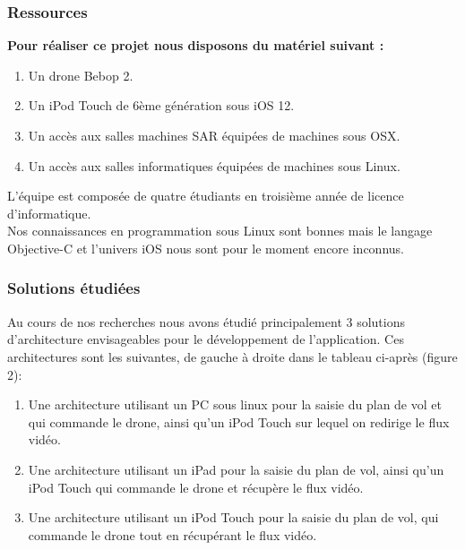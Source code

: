 \documentclass{article}
\begin{document}
	

	
\subsubsection{Ressources}

	    \textbf{Pour réaliser ce projet nous disposons du matériel suivant :}

		\begin{enumerate}
        \item Un drone Bebop 2.
        \item Un iPod Touch de 6ème génération sous iOS 12.
        \item Un accès aux salles machines SAR équipées de machines sous OSX.
        \item Un accès aux salles informatiques équipées de machines sous Linux.
        \end{enumerate}
        

	L'équipe est composée de quatre étudiants en troisième année de licence d'informatique.\\
        Nos connaissances en programmation sous Linux sont bonnes mais le langage Objective-C et l'univers iOS nous sont pour le moment encore inconnus.

\subsubsection{Solutions étudiées}
	Au cours de nos recherches nous avons étudié principalement 3 solutions d'architecture envisageables pour le développement de l'application. Ces architectures sont les suivantes, de gauche à droite dans le tableau ci-après (figure 2): 
	  	\begin{enumerate}
        	\item Une architecture utilisant un PC sous linux pour la saisie du plan de vol et qui commande le drone, ainsi qu'un iPod Touch sur lequel on redirige le flux vidéo.
        	\item Une architecture utilisant un iPad pour la saisie du plan de vol, ainsi qu'un iPod Touch qui commande le drone et récupère le flux vidéo.
         	\item Une architecture utilisant un iPod Touch pour la saisie du plan de vol, qui commande le drone tout en récupérant le flux vidéo.\\
        \end{enumerate}
	
\end{document}
